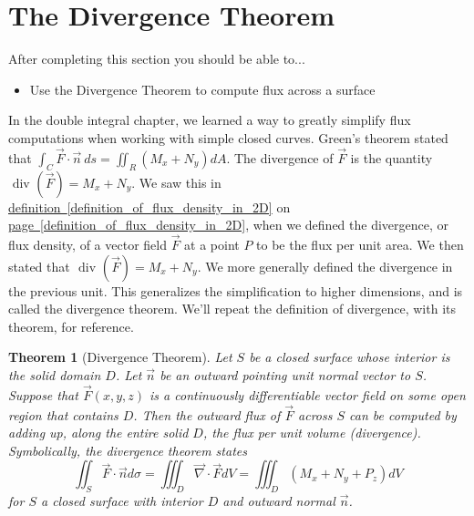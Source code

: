 \documentclass[10pt,]{book}
\theoremstyle{plain}
\newtheorem{theorem}{Theorem}[section]
\theoremstyle{definition}
\theoremstyle{definition}
\theoremstyle{definition}
\theoremstyle{definition}
\theoremstyle{definition}
\numberwithin{equation}{section}
\begin{document}
\section[{The Divergence Theorem}]{The Divergence Theorem}\label{section-48}
After completing this section you should be able to... \leavevmode%
\begin{itemize}[label=\textbullet]
\item{}Use the Divergence Theorem to compute flux across a surface%
\end{itemize}
%
\par
In the double integral chapter, we learned a way to greatly simplify flux computations when working with simple closed curves. Green's theorem stated that \(\int_C \vec F\cdot \vec n\ ds = \iint_R (M_x+N_y) dA\). The divergence of \(\vec F\) is the quantity \(\text{ div } (\vec F) = M_x+N_y\). We saw this in \hyperref[definition_of_flux_density_in_2D]{definition~\ref{definition_of_flux_density_in_2D}} on \hyperref[definition_of_flux_density_in_2D]{page~\ref{definition_of_flux_density_in_2D}}, when we defined the divergence, or flux density, of a vector field \(\vec F\) at a point \(P\) to be the flux per unit area. We then stated that \(\text{ div } (\vec F)=M_x+N_y\). We more generally defined the divergence in the previous unit. This generalizes the simplification to higher dimensions, and is called the divergence theorem. We'll repeat the definition of divergence, with its theorem, for reference.%
\begin{theorem}[{Divergence Theorem}]\label{theorem-15}
Let \(S\) be a closed surface whose interior is the solid domain \(D\). Let \(\vec n\) be an outward pointing unit normal vector to \(S\). Suppose that \(\vec F(x,y,z)\) is a continuously differentiable vector field on some open region that contains \(D\). Then the outward flux of \(\vec F\) across \(S\) can be computed by adding up, along the entire solid \(D\), the flux per unit volume (divergence). Symbolically, the divergence theorem states%
\begin{equation*}
\iint_S\vec F\cdot \vec n d\sigma =  \iiint_D \vec \nabla \cdot \vec F dV = \iiint_D \left(M_x+N_y+P_z\right) dV
\end{equation*}
for \(S\) a closed surface with interior \(D\) and outward normal \(\vec n\).%
\end{theorem}
\end{document}
